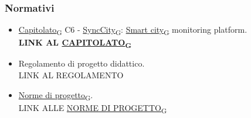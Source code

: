 \subsubsection{Normativi}
\begin{itemize}
	\item \href{https://7last.github.io/docs/rtb/documentazione-interna/glossario\#capitolato}{Capitolato\textsubscript{G}} C6 - \href{https://7last.github.io/docs/rtb/documentazione-interna/glossario\#synccity}{SyncCity\textsubscript{G}}: \href{https://7last.github.io/docs/rtb/documentazione-interna/glossario\#smart-city}{Smart city\textsubscript{G}} monitoring platform.\\
	      \textbf{LINK AL \href{https://7last.github.io/docs/rtb/documentazione-interna/glossario\#capitolato}{CAPITOLATO\textsubscript{G}}}
	\item Regolamento di progetto didattico.\\
	      LINK AL REGOLAMENTO
	\item \href{https://7last.github.io/docs/rtb/documentazione-interna/glossario\#norme-di-progetto}{Norme di progetto\textsubscript{G}}.\\
	      LINK ALLE \href{https://7last.github.io/docs/rtb/documentazione-interna/glossario\#norme-di-progetto}{NORME DI PROGETTO\textsubscript{G}}
\end{itemize}







